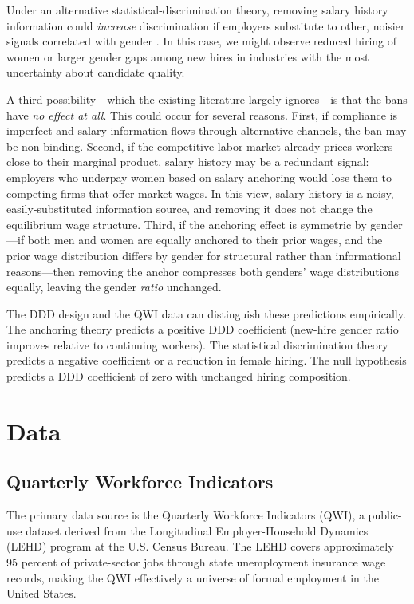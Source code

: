 \documentclass[12pt]{article}
\begin{document}
Under an alternative statistical-discrimination theory, removing salary history information could \textit{increase} discrimination if employers substitute to other, noisier signals correlated with gender \citep{agan2018ban}. In this case, we might observe reduced hiring of women or larger gender gaps among new hires in industries with the most uncertainty about candidate quality.

A third possibility---which the existing literature largely ignores---is that the bans have \textit{no effect at all}. This could occur for several reasons. First, if compliance is imperfect and salary information flows through alternative channels, the ban may be non-binding. Second, if the competitive labor market already prices workers close to their marginal product, salary history may be a redundant signal: employers who underpay women based on salary anchoring would lose them to competing firms that offer market wages. In this view, salary history is a noisy, easily-substituted information source, and removing it does not change the equilibrium wage structure. Third, if the anchoring effect is symmetric by gender---if both men and women are equally anchored to their prior wages, and the prior wage distribution differs by gender for structural rather than informational reasons---then removing the anchor compresses both genders' wage distributions equally, leaving the gender \textit{ratio} unchanged.

The DDD design and the QWI data can distinguish these predictions empirically. The anchoring theory predicts a positive DDD coefficient (new-hire gender ratio improves relative to continuing workers). The statistical discrimination theory predicts a negative coefficient or a reduction in female hiring. The null hypothesis predicts a DDD coefficient of zero with unchanged hiring composition.


\section{Data}\label{sec:data}

\subsection{Quarterly Workforce Indicators}

The primary data source is the Quarterly Workforce Indicators (QWI), a public-use dataset derived from the Longitudinal Employer-Household Dynamics (LEHD) program at the U.S. Census Bureau. The LEHD covers approximately 95 percent of private-sector jobs through state unemployment insurance wage records, making the QWI effectively a universe of formal employment in the United States.
\end{document}
